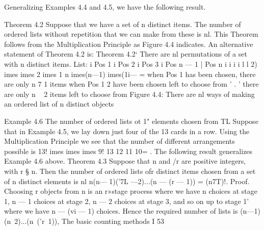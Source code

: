 \documentclass{beamer}
\begin{document}
Generalizing Examples 4.4 and 4.5, we have the following result.

Theorem 4.2 Suppose that we have a set of n distinct items. The number
of ordered lists without repetition that we can make from these is nl.
This Theorem follows from the Multiplication Principle as Figure 4.4
indicates. An alternative statement of Theorem 4.2 is:
Theorem 4.2‘ There are nl permutations of a set with n distinct items.
List: i Pos 1 i Pos 2 i Pos 3 i Pos n — 1 | Pos n i
i i i l l
2) 	imes 	imes 2 	imes 1
n 	imes(n—1)	imes(1i— =
when Pos 1 has been chosen,
there are only n 7 1 items when Pos 1 2 have been chosen
left to choose from ’ . ’
there are only n ~ 2 items
left to choose from
Figure 4.4: There are nl ways of making an ordered list of n distinct objects

Example 4.6 The number of ordered lists ot 1" elements chosen from TL
Suppose that in Example 4.5, we lay down just four of the 13 cards
in a row. Using the Multiplication Principle we see that the number
of different arrangements possible is
13!
	imes 	imes 	imes 9!
13 12 11 10= .
The following result generalizes Example 4.6 above.
Theorem 4.3 Suppose that n and /r are positive integers, with r § n.
Then the number of ordered lists ofr distinct items chosen from a set of
n distinct elements is
nl
n(n— 1)('7L —2)...(n — (r — 1)) = (n7T)!.
Proof. Choosing r objects from n is an r»stage process where we
have n choices at stage 1, n — 1 choices at stage 2, n — 2 choices at
stage 3, and so on up to stage 1' where we have n — (vi — 1) choices.
Hence the required number of lists is
(n—1)(n~2)...(n~('r~1)),
The basic counting methods
I
53
\end{document}
